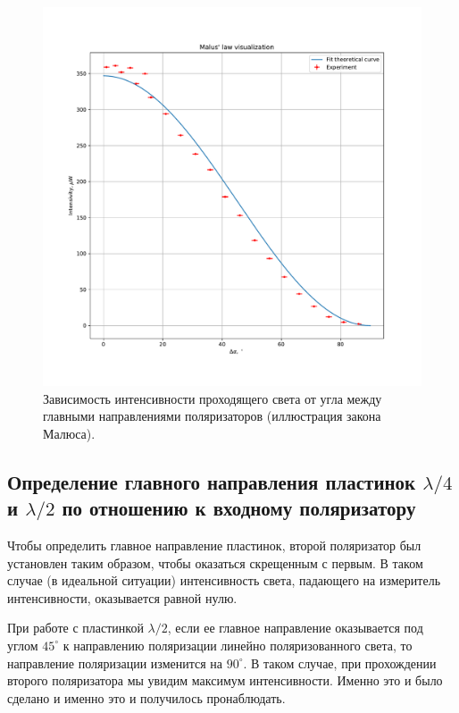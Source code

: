 \documentclass[a4paper, 12pt]{article}
\begin{document}
\begin{figure}[H]
	\centering
	\includegraphics[width=\linewidth]{lab_1}
	\caption{Зависимость интенсивности проходящего света от угла между главными направлениями поляризаторов (иллюстрация закона Малюса).}
	\label{fig:malus}
\end{figure}

\subsection{Определение главного направления пластинок $\lambda / 4$ и $\lambda / 2$ по отношению к входному поляризатору}

Чтобы определить главное направление пластинок, второй поляризатор был установлен таким образом, чтобы оказаться скрещенным с первым. В таком случае (в идеальной ситуации) интенсивность света, падающего на измеритель интенсивности, оказывается равной нулю.

При работе с пластинкой $\lambda / 2$, если ее главное направление оказывается под углом $45^\circ$ к направлению поляризации линейно поляризованного света, то направление поляризации изменится на $90^\circ$. В таком случае, при прохождении второго поляризатора мы увидим максимум интенсивности. Именно это и было сделано и именно это и получилось пронаблюдать.
\end{document}
